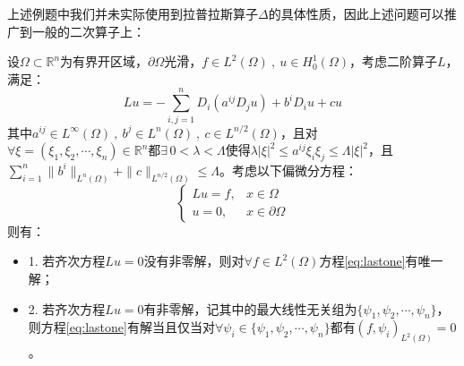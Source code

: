 上述例题中我们并未实际使用到拉普拉斯算子$\Delta$的具体性质，因此上述问题可以推广到一般的二次算子上：
\begin{theorem}
设$\Omega \subset \mathbb{R}^n$为有界开区域，$\partial\Omega$光滑，$f \in L^2(\Omega) \ , \ u \in H^1_0(\Omega)$，考虑二阶算子$L$，满足：
\[Lu=-\sum_{i,j=1}^nD_i(a^{ij}D_ju)+b^iD_iu+cu\]
其中$a^{ij} \in L^{\infty}(\Omega) \ , \ b^j \in L^n(\Omega) \ , \ c \in L^{n/2}(\Omega)$，且对$\forall \xi=(\xi_1,\xi_2,\cdots,\xi_n) \in \mathbb{R}^n$都$\exists \, 0<\lambda<\Lambda$使得$\lambda|\xi|^2 \leq a^{ij}\xi_i\xi_j \leq \Lambda|\xi|^2$，且$\sum_{i=1}^n\|b^i\|_{L^n(\Omega)}+\|c\|_{L^{n/2}(\Omega)} \leq \Lambda$。考虑以下偏微分方程：
\begin{equation}\label{eq:lastone}
\left\{\begin{array}{rl}
Lu = f, & x \in \Omega \\
u=0, & x \in \partial\Omega
\end{array}\right.
\end{equation}
则有：
\begin{itemize}
\item 1. 若齐次方程$Lu=0$没有非零解，则对$\forall f \in L^2(\Omega)$方程\eqref{eq:lastone}有唯一解；
\item 2. 若齐次方程$Lu=0$有非零解，记其中的最大线性无关组为$\{\psi_1,\psi_2,\cdots,\psi_n\}$，则方程\eqref{eq:lastone}有解当且仅当对$\forall \psi_i \in \{\psi_1,\psi_2,\cdots,\psi_n\}$都有$(f,\psi_i)_{L^2(\Omega)}=0$。
\end{itemize}
\end{theorem}